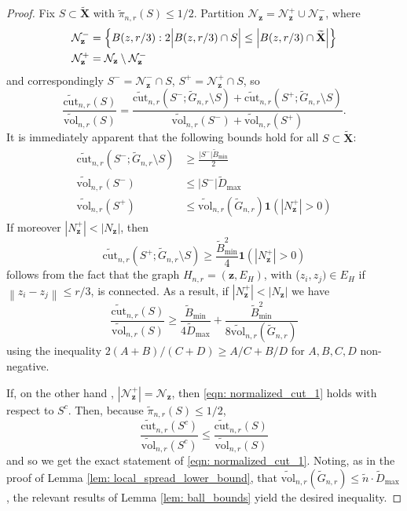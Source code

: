 \documentclass{article}
\newcommand{\set}[1]{\left\{#1\right\}}
\newcommand{\vol}{\mathrm{vol}}
\newcommand{\abs}[1]{\left \lvert #1 \right \rvert}
\newcommand{\norm}[1]{\left\lVert#1\right\rVert}
\newcommand{\1}{\mathbf{1}}
\newcommand{\cut}{\mathrm{cut}}
\newcommand{\zbf}{\mathbf{z}}
\newcommand{\Xbf}{\mathbf{X}}
\newcommand{\wn}{\widetilde{n}}
\newcommand{\wX}{\widetilde{\Xbf}}
\theoremstyle{aldenthm}
\begin{document}
\begin{proof}
	Fix $S \subset \wX$ with $\widetilde{\pi}_{n,r}(S) \leq 1/2$. Partition $\mathcal{N}_{\zbf} = \mathcal{N}_{\zbf}^+ \cup \mathcal{N}_{\zbf}^-$, where
	\begin{align*}
	\mathcal{N}_{\zbf}^- & = \set{B(z,r/3): 2 \Bigl\vert B(z,r/3) \cap S\Bigr\vert \leq \abs{B(z,r/3) \cap \wX} } \\
	\mathcal{N}_{\zbf}^+ & = \mathcal{N}_{\zbf} \setminus \mathcal{N}_{\zbf}^-
	\end{align*}
	and correspondingly $S^- = \mathcal{N}_{\zbf}^- \cap S$, $S^+ = \mathcal{N}_{\zbf}^+ \cap S$, so
	\begin{equation*}
	\frac{\widetilde{\cut}_{n,r}(S)}{\widetilde{\vol}_{n,r}(S)} = \frac{\widetilde{\cut}_{n,r}(S^-; \widetilde{G}_{n,r} \setminus S) + \widetilde{\cut}_{n,r}(S^+; \widetilde{G}_{n,r} \setminus S)}{\widetilde{\vol}_{n,r}(S^-) + \widetilde{\vol}_{n,r}(S^+)}.
	\end{equation*}
	It is immediately apparent that the following bounds hold for all $S \subset \wX$:
	\begin{align*}
	\widetilde{\cut}_{n,r}(S^-; \widetilde{G}_{n,r} \setminus S) & \geq \frac{\abs{S^-} \widetilde{B}_{\min}}{2}\\
	\widetilde{\vol}_{n,r}(S^-) & \leq \abs{S^-} \widetilde{D}_{\max} \\
	\widetilde{\vol}_{n,r}(S^+) & \leq \widetilde{\vol}_{n,r}(\widetilde{G}_{n,r}) \1(\abs{N_{\zbf}^+} > 0 )
	\end{align*}
	If moreover $\abs{N_{\zbf}^+} < \abs{N_{\zbf}}$, then 
	\begin{equation*}
	\widetilde{\cut}_{n,r}(S^+; \widetilde{G}_{n,r} \setminus S) \geq \frac{\widetilde{B}_{\min}^2}{4} \1(\abs{N_{\zbf}^+} > 0)
	\end{equation*}
	follows from the fact that the graph $H_{n,r} = (\zbf, E_H)$, with ($z_i, z_j) \in E_H$ if $\norm{z_i - z_j} \leq r/3$, is connected. As a result, if $\abs{N_{\zbf}^+} < \abs{N_{\zbf}}$ we have
	\begin{equation}
	\label{eqn: normalized_cut_1}
	\frac{\widetilde{\cut}_{n,r}(S)}{\widetilde{\vol}_{n,r}(S)} \geq \frac{ \widetilde{B}_{\min}}{4\widetilde{D}_{\max}} +  \frac{\widetilde{B}_{\min}^2}{8 \widetilde{\vol}_{n,r}(\widetilde{G}_{n,r})}
	\end{equation}
	using the inequality $2(A + B)/ (C + D) \geq A/C + B/D$ for $A,B,C,D$ non-negative.
	
	If, on the other hand , $\abs{\mathcal{N}_{\zbf}^+} = \mathcal{N}_{\zbf}$, then \eqref{eqn: normalized_cut_1} holds with respect to $S^c$. Then, because $\widetilde{\pi}_{n,r}(S) \leq 1/2$, 
	\begin{equation*}
	\frac{\widetilde{\cut}_{n,r}(S^c)}{\widetilde{\vol}_{n,r}(S^c)} \leq \frac{\widetilde{\cut}_{n,r}(S)}{\widetilde{\vol}_{n,r}(S)}
	\end{equation*}
	and so we get the exact statement of \eqref{eqn: normalized_cut_1}. Noting, as in the proof of Lemma \ref{lem: local_spread_lower_bound}, that  $\widetilde{\vol}_{n,r}(\widetilde{G}_{n,r}) \leq \wn \cdot \widetilde{D}_{\max}$, the relevant results of Lemma \ref{lem: ball_bounds} yield the desired inequality. 
\end{proof}
\end{document}
